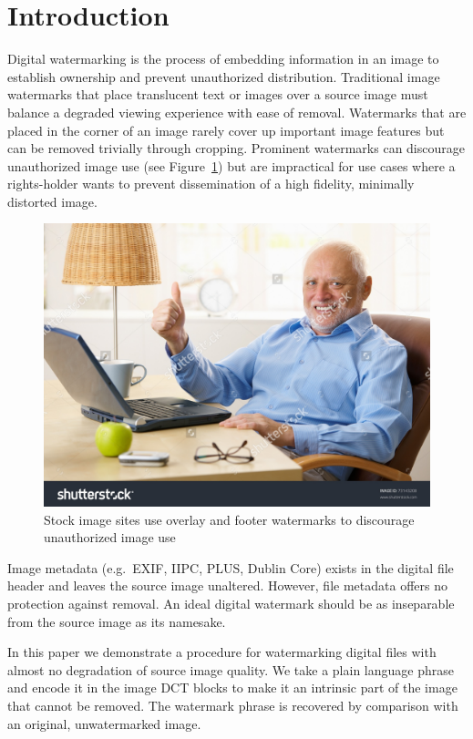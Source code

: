 \section{Introduction}\label{sec:intro}
Digital watermarking is the process of embedding information in an image to establish ownership and prevent unauthorized distribution.
Traditional image watermarks that place translucent text or images over a source image must balance a degraded viewing experience with ease of removal.
Watermarks that are placed in the corner of an image rarely cover up important image features but can be removed trivially through cropping.
Prominent watermarks can discourage unauthorized image use (see Figure~\ref{fig:thumbs-up-wm}) but are impractical for use cases where a rights-holder wants to prevent dissemination of a high fidelity, minimally distorted image.

\begin{figure}[tbph]
  \centering
  \includegraphics[width=0.7\linewidth]{graphics/thumbs-up-wm}
  \caption{Stock image sites use overlay and footer watermarks to discourage unauthorized image use~\cite{stocklite:old-man}}
  \label{fig:thumbs-up-wm}
\end{figure}

Image metadata (e.g.\ EXIF, IIPC, PLUS, Dublin Core) exists in the digital file header and leaves the source image unaltered.
However, file metadata offers no protection against removal.\citeneeded{} An ideal digital watermark should be as inseparable from the source image as its namesake.

In this paper we demonstrate a procedure for watermarking digital files with almost no degradation of source image quality.
We take a plain language phrase and encode it in the image DCT blocks to make it an intrinsic part of the image that cannot be removed.
The watermark phrase is recovered by comparison with an original, unwatermarked image.
